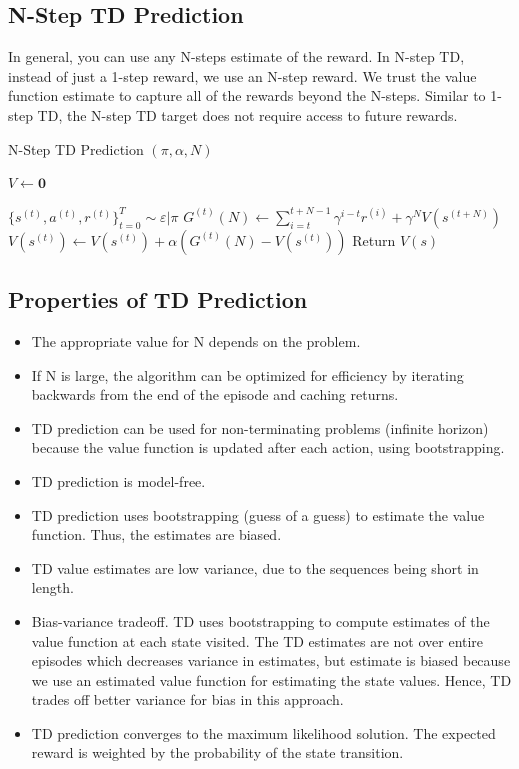 \documentclass[11pt]{article}
\begin{document}
\subsection{N-Step TD Prediction}
In general, you can use any N-steps estimate of the reward. 
In N-step TD, instead of just a 1-step reward, we use an N-step reward. We trust the value function estimate to capture all of the rewards beyond the N-steps. Similar to 1-step TD, the N-step TD target does not require access to future rewards.

\begin{algorithm}[H]
\caption{N-Step TD Prediction $(\pi, \alpha, N)$}
\label{algo:NTD}
\begin{algorithmic}[1]
\STATE $V \leftarrow \mathbf{0}$ \hfill
{}

\STATE $\{s^{(t)}, a^{(t)}, r^{(t)}\}_{t=0}^T \sim \varepsilon|\pi$ \hfill 
{}
\STATE $G^{(t)}(N) \leftarrow \sum_{i=t}^{t+N-1} \gamma^{i-t} r^{(i)}+ \gamma^N V(s^{(t+N)})$ \hfill 
\STATE $V(s^{(t)}) \leftarrow V(s^{(t)}) + \alpha(G^{(t)}(N)-V(s^{(t)}))$  \hfill
\ENDFOR
\ENDFOR
\STATE Return $V(s)$  \hfill
\end{algorithmic}
\end{algorithm}

\subsection{Properties of TD Prediction}
\begin{itemize}
    \item The appropriate value for N depends on the problem.
    \item If N is large, the algorithm can be optimized for efficiency by iterating backwards from the end of the episode and caching returns.
    \item TD prediction can be used for non-terminating problems (infinite horizon) because the value function is updated after each action, using bootstrapping.
    \item TD prediction is model-free.
    \item TD prediction uses bootstrapping (guess of a guess) to estimate the value function. Thus, the estimates are biased. 
    \item TD value estimates are low variance, due to the sequences being short in length. 
    \item Bias-variance tradeoff. TD uses bootstrapping to compute estimates of the value function at each state visited. The TD estimates are not over entire episodes which decreases variance in estimates, but estimate is biased because we use an estimated value function for estimating the state values. Hence, TD trades off better variance for bias in this approach.
    \item TD prediction converges to the maximum likelihood solution. The expected reward is weighted by the probability of the state transition. 
\end{itemize}
\end{document}
